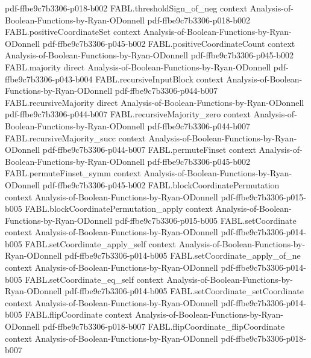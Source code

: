 \begin{theorem}
  {pdf-ffbe9c7b3306-p018-b002}
\proofstep
  {FABL.thresholdSign_of_neg}
  {context}
  {Analysis-of-Boolean-Functions-by-Ryan-ODonnell}
  {pdf-ffbe9c7b3306-p018-b002}
\proofstep
  {FABL.positiveCoordinateSet}
  {context}
  {Analysis-of-Boolean-Functions-by-Ryan-ODonnell}
  {pdf-ffbe9c7b3306-p045-b002}
\proofstep
  {FABL.positiveCoordinateCount}
  {context}
  {Analysis-of-Boolean-Functions-by-Ryan-ODonnell}
  {pdf-ffbe9c7b3306-p045-b002}
\proofstep
  {FABL.majority}
  {direct}
  {Analysis-of-Boolean-Functions-by-Ryan-ODonnell}
  {pdf-ffbe9c7b3306-p043-b004}
\proofstep
  {FABL.recursiveInputBlock}
  {context}
  {Analysis-of-Boolean-Functions-by-Ryan-ODonnell}
  {pdf-ffbe9c7b3306-p044-b007}
\proofstep
  {FABL.recursiveMajority}
  {direct}
  {Analysis-of-Boolean-Functions-by-Ryan-ODonnell}
  {pdf-ffbe9c7b3306-p044-b007}
\proofstep
  {FABL.recursiveMajority_zero}
  {context}
  {Analysis-of-Boolean-Functions-by-Ryan-ODonnell}
  {pdf-ffbe9c7b3306-p044-b007}
\proofstep
  {FABL.recursiveMajority_succ}
  {context}
  {Analysis-of-Boolean-Functions-by-Ryan-ODonnell}
  {pdf-ffbe9c7b3306-p044-b007}
\proofstep
  {FABL.permuteFinset}
  {context}
  {Analysis-of-Boolean-Functions-by-Ryan-ODonnell}
  {pdf-ffbe9c7b3306-p045-b002}
\proofstep
  {FABL.permuteFinset_symm}
  {context}
  {Analysis-of-Boolean-Functions-by-Ryan-ODonnell}
  {pdf-ffbe9c7b3306-p045-b002}
\proofstep
  {FABL.blockCoordinatePermutation}
  {context}
  {Analysis-of-Boolean-Functions-by-Ryan-ODonnell}
  {pdf-ffbe9c7b3306-p015-b005}
\proofstep
  {FABL.blockCoordinatePermutation_apply}
  {context}
  {Analysis-of-Boolean-Functions-by-Ryan-ODonnell}
  {pdf-ffbe9c7b3306-p015-b005}
\proofstep
  {FABL.setCoordinate}
  {context}
  {Analysis-of-Boolean-Functions-by-Ryan-ODonnell}
  {pdf-ffbe9c7b3306-p014-b005}
\proofstep
  {FABL.setCoordinate_apply_self}
  {context}
  {Analysis-of-Boolean-Functions-by-Ryan-ODonnell}
  {pdf-ffbe9c7b3306-p014-b005}
\proofstep
  {FABL.setCoordinate_apply_of_ne}
  {context}
  {Analysis-of-Boolean-Functions-by-Ryan-ODonnell}
  {pdf-ffbe9c7b3306-p014-b005}
\proofstep
  {FABL.setCoordinate_eq_self}
  {context}
  {Analysis-of-Boolean-Functions-by-Ryan-ODonnell}
  {pdf-ffbe9c7b3306-p014-b005}
\proofstep
  {FABL.setCoordinate_setCoordinate}
  {context}
  {Analysis-of-Boolean-Functions-by-Ryan-ODonnell}
  {pdf-ffbe9c7b3306-p014-b005}
\proofstep
  {FABL.flipCoordinate}
  {context}
  {Analysis-of-Boolean-Functions-by-Ryan-ODonnell}
  {pdf-ffbe9c7b3306-p018-b007}
\proofstep
  {FABL.flipCoordinate_flipCoordinate}
  {context}
  {Analysis-of-Boolean-Functions-by-Ryan-ODonnell}
  {pdf-ffbe9c7b3306-p018-b007}

\end{theorem}

